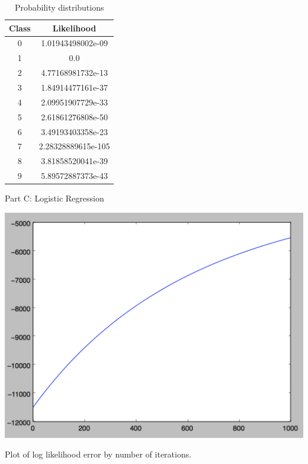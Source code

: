 \documentclass[11pt]{article}
\begin{document}
\begin{table}[!th]
\centering
\begin{tabular}{|c|c|}
\hline
Class & Likelihood \\
\hline
0 & 1.01943498002e-09 \\
1 & 0.0 \\
2 & 4.77168981732e-13 \\
3 & 1.84914477161e-37 \\
4 & 2.09951907729e-33 \\
5 & 2.61861276808e-50 \\
6 & 3.49193403358e-23 \\
7 & 2.28328889615e-105 \\
8 & 3.81858520041e-39 \\
9 & 5.89572887373e-43 \\
\hline
\end{tabular}
\caption{Probability distributions}
\label{ex:table}
\end{table}

Part C: Logistic Regression

\includegraphics[scale=.8]{images/loglikelihood.png}

Plot of log likelihood error by number of iterations.
\end{document}
